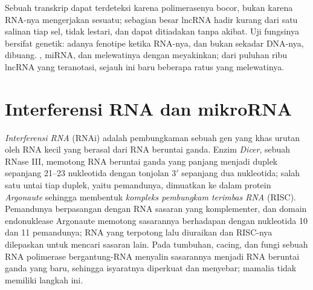 \begin{remark}\label{rem:b3:rna-regulation:function}
Sebuah transkrip dapat terdeteksi karena polimerasenya bocor, bukan karena
RNA-nya mengerjakan sesuatu; sebagian besar lncRNA hadir kurang dari satu
salinan tiap sel, tidak lestari, dan dapat ditiadakan tanpa akibat. Uji
fungsinya bersifat genetik: adanya fenotipe ketika RNA-nya, dan bukan sekadar
DNA-nya, dibuang. \emph{}, miRNA, dan  melewatinya dengan
meyakinkan; dari puluhan ribu lncRNA yang teranotasi, sejauh ini baru
beberapa ratus yang melewatinya.
\end{remark}

\section{Interferensi RNA dan mikroRNA}

\begin{definition}\label{def:b3:rna-regulation:rnai}
\emph{Interferensi RNA} (RNAi) adalah pembungkaman sebuah gen yang khas
urutan oleh RNA kecil yang berasal dari RNA beruntai ganda. Enzim
\emph{Dicer}, sebuah RNase III, memotong RNA beruntai ganda yang panjang
menjadi duplek sepanjang \numrange{21}{23} nukleotida dengan tonjolan 3$'$
sepanjang dua nukleotida; salah satu untai tiap duplek, yaitu pemandunya,
dimuatkan ke dalam protein \emph{Argonaute} sehingga membentuk
\emph{kompleks pembungkam terimbas RNA} (RISC). Pemandunya berpasangan dengan
RNA sasaran yang komplementer, dan domain endonuklease Argonaute memotong
sasarannya berhadapan dengan nukleotida 10 dan 11 pemandunya; RNA yang
terpotong lalu diuraikan dan RISC-nya dilepaskan untuk mencari sasaran lain.
Pada tumbuhan, cacing, dan fungi sebuah RNA polimerase bergantung-RNA
menyalin sasarannya menjadi RNA beruntai ganda yang baru, sehingga isyaratnya
diperkuat dan menyebar; mamalia tidak memiliki langkah ini.
\end{definition}

